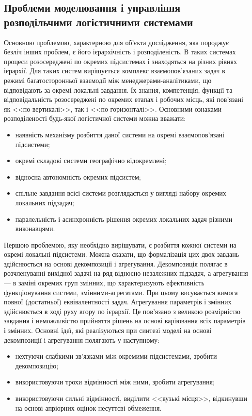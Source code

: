 \subsection{Проблеми моделювання і управління розподільчими логістичними системами}
Основною проблемою, характерною для об'єкта дослідження, яка породжує безліч інших проблем, є його ієрархічність і розподіленість. 
В таких системах процеси розосереджені по окремих підсистемах і знаходяться на різних рівнях ієрархії. 
Для таких систем вирішується комплекс взаємопов'язаних задач в режимі багатосторонньої взаємодії між менеджерами-аналітиками, що відповідають за окремі локальні завдання. 
Їх знання, компетенція, функції та відповідальність розосереджені по окремих етапах і робочих місць, які пов'язані як <<по вертикалі>>, так і <<по горизонталі>>.
Основними ознаками розподіленості будь-якої логістичної системи можна вважати:
\begin{itemize}
	\item наявність механізму розбиття даної системи на окремі взаємопов'язані підсистеми;
	\item окремі складові системи географічно відокремлені;
	\item відносна автономність окремих підсистем;
	\item спільне завдання всієї системи розглядається у вигляді набору окремих локальних підзадач;
	\item паралельність і асинхронність рішення окремих локальних задач різними виконавцями.
\end{itemize}

Першою проблемою, яку необхідно вирішувати, є розбиття кожної системи на окремі локальні підсистеми. 
Можна сказати, що формалізація цих двох завдань здійснюється на основі декомпозиції і агрегування. 
Декомпозиція полягає в розчленуванні вихідної задачі на ряд відносно незалежних підзадач, а агрегування --- в заміні окремих груп змінних, що характеризують ефективність функціонування системи, змінними-агрегатами. 
При цьому висувається вимога повної (достатньої) еквівалентності задач. 
Агрегування параметрів і змінних здійснюється в ході руху вгору по ієрархії. 
Це пов'язано з великою розмірністю завдання і неможливістю прийняття рішень на основі варіювання всіх параметрів і змінних. 
Основні ідеї, які реалізуються при синтезі моделі на основі декомпозиції і агрегування полягають у наступному:
\begin{itemize}
	\item нехтуючи слабкими зв'язками між окремими підсистемами, зробити декомпозицію;
	\item використовуючи трохи відмінності між ними, зробити агрегування;
	\item використовуючи сильні відмінності, виділити <<вузькі місця>>, відкинувши на основі апріорних оцінок несуттєві обмеження.
\end{itemize}

